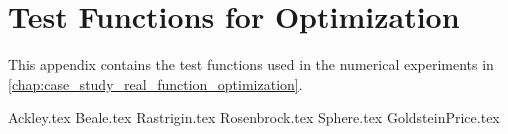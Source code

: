 \chapter{Test Functions for Optimization}
\label{app:test_functions}
  This appendix contains the test functions used in the numerical experiments in 
  \vref{chap:case_study_real_function_optimization}.

  {Ackley.tex}
  {Beale.tex}
  {Rastrigin.tex}
  {Rosenbrock.tex}
  {Sphere.tex}
  {GoldsteinPrice.tex}
